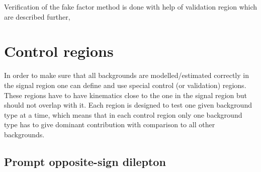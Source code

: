 Verification of the fake factor method is done with help of validation region which are described further,




\section{Control regions}

In order to make sure that all backgrounds are modelled/estimated correctly in the signal region one can define and use special control (or validation) regions.
These regions have to have kinematics close to the one in the signal region but should not overlap with it. Each region is designed to test one given background type at a time,
which means that in each control region only one background type has to give dominant contribution with comparison to all other backgrounds.

\subsection{Prompt opposite-sign dilepton}


